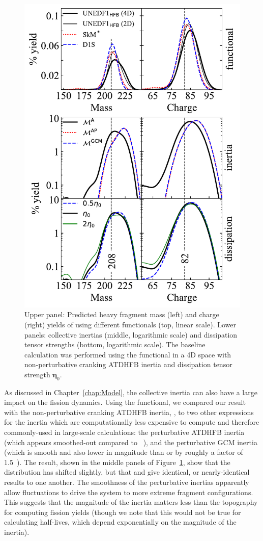 \begin{figure}
	\centering
	\includegraphics[width=0.7\linewidth]{TeX_files/294Og_compare_all}
	\caption[$^{294}$Og heavy fragment masses and charges.]{Upper panel: Predicted heavy fragment mass (left) and charge (right) yields of \Og{} using different functionals (top, linear scale). Lower panels: collective inertias (middle, logarithmic scale) and dissipation tensor strengths (bottom, logarithmic scale). The baseline calculation was performed using the \hfb{} functional in a 4D space with non-perturbative cranking ATDHFB inertia and dissipation tensor strength $\mathbf{\eta}_0$.}
	\label{fig:294ogcompareall}
\end{figure}

As discussed in Chapter~\ref{chap:Model}, the collective inertia can also have a large impact on the fission dynamics. Using the {\hfb} functional, we compared our result with the non-perturbative cranking ATDHFB inertia, {\MATDHF}, to two other expressions for the inertia which are computationally less expensive to compute and therefore commonly-used in large-scale calculations: the perturbative ATDHFB inertia {\MATDHFp} (which appears smoothed-out compared to {\MATDHF}~\cite{giuliani2018b}), and the perturbative GCM inertia {\MGCMp} (which is smooth and also lower in magnitude than {\MATDHF} or {\MATDHFp} by roughly a factor of 1.5~\cite{giuliani2018b}). The result, shown in the middle panels of Figure~\ref{fig:294ogcompareall}, show that the distribution has shifted slightly, but that {\MATDHFp} and {\MGCMp} give identical, or nearly-identical results to one another. The smoothness of the perturbative inertias apparently allow fluctuations to drive the system to more extreme fragment configurations. This suggests that the magnitude of the inertia matters less than the topography for computing fission yields (though we note that this would not be true for calculating half-lives, which depend exponentially on the magnitude of the inertia).

